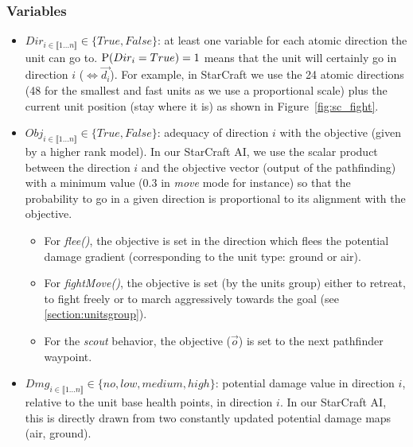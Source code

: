 \subsubsection{Variables}
\begin{itemize}
\item $Dir_{i \in \llbracket 1 \dots n\rrbracket } \in \{True, False\}$: at least one variable for each atomic direction the unit can go to. $\mathrm{P}(Dir_i = True) = 1$ means that the unit will certainly go in direction $i$ ($\Leftrightarrow \vec{d_i}$). For example, in StarCraft we use the 24 atomic directions (48 for the smallest and fast units as we use a proportional scale) plus the current unit position (stay where it is) as shown in Figure~\ref{fig:sc_fight}. %

\item $Obj_{i \in \llbracket 1 \dots n\rrbracket } \in \{True, False\}$: adequacy of direction $i$ with the objective (given by a higher rank model). In our StarCraft AI, we use the scalar product between the direction $i$ and the objective vector (output of the pathfinding) with a minimum value ($0.3$ in \textit{move} mode for instance) so that the probability to go in a given direction is proportional to its alignment with the objective.
\begin{itemize}
    \item For \textit{flee()}, the objective is set in the direction which flees the potential damage gradient (corresponding to the unit type: ground or air).
    \item For \textit{fightMove()}, the objective is set (by the units group) either to retreat, to fight freely or to march aggressively towards the goal (see \ref{section:unitsgroup}).
    \item For the \textit{scout} behavior, the objective ($\vec{o}$) is set to the next pathfinder waypoint.
\end{itemize}

\item $Dmg_{i \in \llbracket 1 \dots n\rrbracket } \in \{no, low, medium, high\}$: potential damage value in direction $i$, relative to the unit base health points, in direction $i$. In our StarCraft AI, this is directly drawn from two constantly updated potential damage maps (air, ground). %


\end{itemize}
